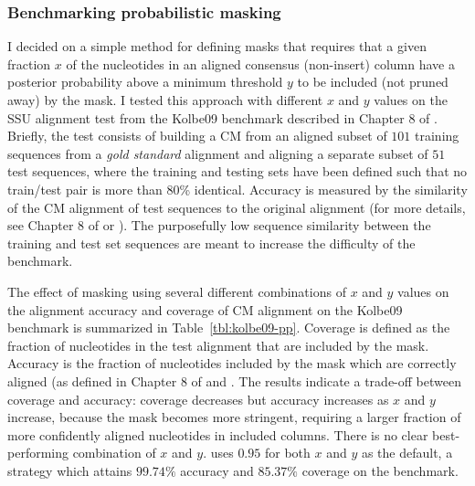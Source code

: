 \subsubsection{Benchmarking probabilistic masking}

I decided on a simple method for defining masks that requires that
a given fraction $x$ of the nucleotides in an aligned consensus
(non-insert) column have a posterior probability above a minimum
threshold $y$ to be included (not pruned away) by the mask. I tested
this approach with different $x$ and $y$ values on 
the SSU alignment test from the Kolbe09 benchmark \cite{KolbeEddy09}
described in Chapter 8 of \cite{Nawrocki09b}. Briefly, the test consists of building a CM
from an aligned subset of $101$ training sequences from a \emph{gold
standard}  alignment and aligning a separate subset of $51$ test
sequences, where the training and testing sets have been defined such
that no train/test pair is more than 80\% identical. Accuracy is
measured by the similarity of the CM alignment of test sequences to
the original  alignment (for more details, see Chapter 8 of
\cite{Nawrocki09b} or
\cite{KolbeEddy09}). The purposefully low sequence similarity between
the training and test set sequences are meant to increase the
difficulty of the benchmark. 

The effect of masking using several different combinations of $x$ and
$y$ values on the alignment accuracy and coverage of CM alignment on
the Kolbe09 benchmark is summarized in
Table~\ref{tbl:kolbe09-pp}. Coverage is defined as the fraction of
nucleotides in the test alignment that are included by the mask. Accuracy
is the fraction of nucleotides included by the mask which are correctly
aligned (as defined in Chapter 8 of \cite{Nawrocki09b} and \cite{KolbeEddy09}. 
The results indicate a trade-off between 
coverage and accuracy: coverage decreases but accuracy increases
as $x$ and $y$ increase, because the mask becomes more stringent,
requiring a larger fraction of more confidently aligned nucleotides in
included columns. There is no clear best-performing combination of $x$
and $y$.  uses $0.95$ for both $x$ and $y$ as the
default, a strategy which attains $99.74\%$ accuracy and $85.37\%$
coverage on the benchmark. 

